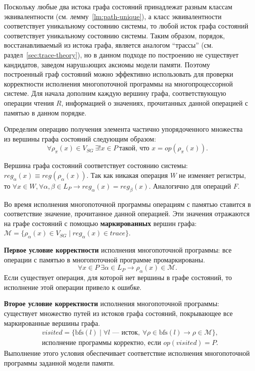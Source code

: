Поскольку любые два истока графа состояний принадлежат разным классам
эквивалентности (см. лемму~\ref{lm:path-unique}), а класс эквивалентности
соответствует уникальному состоянию системы, то любой исток графа
состояний соответствует уникальному состоянию системы.
Таким образом, порядок, восстанавливаемый из истока графа, является
аналогом ``трассы'' (см. раздел~\ref{sec:trace-theory}), но в данном
подходе по построению не существует кандидатов, заведом нарушaющих
аксиомы модели памяти.
Поэтому
построенный граф состояний можно эффективно использовать для проверки
корректности исполнения многопоточной программы на многопроцессорной
системе. Для начала дополним каждую вершину графа, соответствующую
операции чтения $R$, информацией о значениях, прочитанных данной
операцией с памятью в данном порядке.

Определим операцию получения элемента частично упорядоченного
множества из вершины графа состояний следующим образом:
\begin{equation}
  \forall \rho_{\pi}(x) \in V_{SG}\ \exists! x \in P\ \text{такой,
  что } x = op(\rho_{\pi}(x)).
  \label{eq:op_rho}
\end{equation}

Вершина графа состояний соответствует состоянию системы:
$reg_{\alpha}(x) \equiv reg(\rho_{\alpha}(x))$. Так как никакая
операция $W$ не изменяет регистры, то $\forall x \in W, \forall
\alpha,\beta \in L_P \rightarrow reg_{\alpha}(x) = reg_{\beta}(x)$.
Аналогично для операций $F$.

\begin{definition}
  \label{def:mark}
  Во время исполнения многопоточной программы операциям с памятью
  ставится в соответствие значение, прочитанное данной операцией. Эти
  значения отражаются на графе состояний с помощью
  \textbf{маркированных} вершин графа: $\mathcal{M} =
  \{\rho_{\alpha}(x) \in V_{SG} \mid reg_{\alpha}(x) \in trace\}$.
\end{definition}

\textbf{Первое условие корректности} исполнения многопоточной
программы: все операции с памятью в многопоточной программе промаркированы.
\begin{equation}
  \label{eq:verif-1st}
  \forall x \in P\ \exists \alpha \in L_P \rightarrow
  \rho_{\alpha}(x) \in \mathcal{M}.
\end{equation}
Если существует операция, для которой нет вершины в графе состояний,
то исполнение этой операции привело к ошибке.

\textbf{Второе условие корректности} исполнения многопоточной
программы: существует множество путей из истоков графа состояний,
покрывающее все маркированные вершины графа.
\begin{align}
  \label{eq:verif-2nd}
  & visited = \{\text{bfs}(l) \mid \forall l \text{ —
    исток},\ \forall \rho \in \text{bfs}(l) \rightarrow \rho \in
  \mathcal{M}\}, \nonumber \\
  & \text{исполнение программы корректно, если } op(visited) = P.
\end{align}
Выполнение этого условия обеспечивает соответствие исполнения
многопоточной программы заданной модели памяти.

